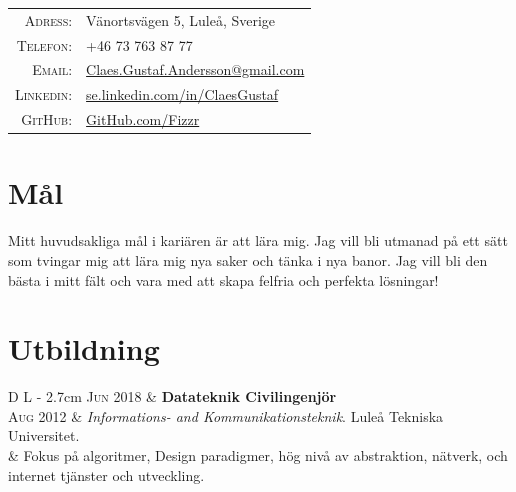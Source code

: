 \documentclass[a4paper,10pt]{article}
\begin{document}
\begin{tabular}{Dl}
    \textsc{Adress:}	&	 Vänortsvägen 5, Luleå, Sverige \\
    \textsc{Telefon:}		&	 +46 73 763 87 77\\
    \textsc{Email:}		&	 \href{mailto:Claes.Gustaf.Andersson@gmail.com}{Claes.Gustaf.Andersson@gmail.com}\\
    \textsc{Linkedin:}	&	 \url{se.linkedin.com/in/ClaesGustaf} \\
    \textsc{GitHub:}		&	 \href{https://github.com/Fizzr}{GitHub.com/Fizzr}
\end{tabular}

\section{Mål}
{\small Mitt huvudsakliga mål i kariären är att lära mig. Jag vill bli utmanad på ett sätt som tvingar mig att lära mig nya saker och tänka i nya banor. Jag vill bli den bästa i mitt fält och vara med att skapa felfria och perfekta lösningar!}

\section{Utbildning}
\begin{tabular}{D L {\textwidth - 2.7cm}}
\textsc{Jun 2018}	&	\textbf{Datateknik Civilingenjör}\\
\textsc{Aug 2012}	&	 \emph{Informations- and Kommunikationsteknik}. Luleå Tekniska Universitet.\\
			&	{\small Fokus på algoritmer, Design paradigmer, hög nivå av abstraktion, nätverk, och internet tjänster och utveckling.}
\end{tabular}


\end{document}
